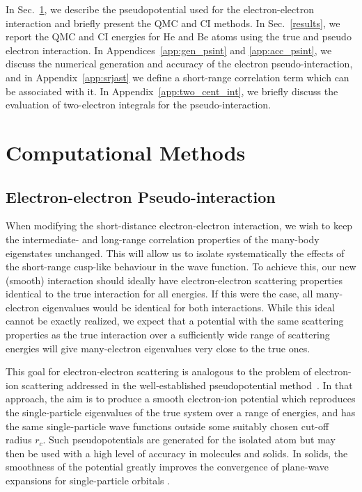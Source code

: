 In Sec.~\ref{methods}, we describe the pseudopotential used for
the electron-electron interaction and briefly present the QMC
and CI methods.
In Sec.~\ref{results}, we report the QMC and CI energies for He 
and Be atoms using the true and pseudo electron interaction.
In Appendices~\ref{app:gen_psint} and \ref{app:acc_psint}, we discuss the
numerical generation and accuracy of the electron pseudo-interaction, 
and in Appendix~\ref{app:srjast} we define a short-range correlation
term which can be associated with it.
In Appendix~\ref{app:two_cent_int}, we briefly discuss the
evaluation of two-electron integrals for the pseudo-interaction.


\section{Computational Methods}
\label{methods}
%
%
\subsection{Electron-electron Pseudo-interaction}
\label{methods:pseudoint}

When modifying the short-distance electron-electron interaction,
we wish to keep the intermediate- and long-range correlation 
properties of the many-body eigenstates unchanged.
This will allow us to isolate systematically the effects of the short-range 
cusp-like behaviour in the wave function.
To achieve this, our new (smooth) interaction should ideally 
have electron-electron scattering properties identical to the true 
interaction for all energies.
If this were the case, all many-electron eigenvalues would be identical 
for both interactions.
While this ideal cannot be exactly realized, we expect that a potential 
with the same scattering properties as the true interaction over 
a sufficiently wide range of scattering energies will give many-electron 
eigenvalues very close to the true ones. 

This goal for electron-electron scattering is analogous to the 
problem of electron-ion scattering addressed in the well-established 
pseudopotential method~\cite{HSC}.
In that approach, the aim is to produce a smooth electron-ion potential 
which reproduces the single-particle eigenvalues of the true system 
over a range of energies, and has the same single-particle wave 
functions outside some suitably chosen cut-off radius $r_c$.
Such pseudopotentials are generated for the isolated atom but may 
then be used with a high level of accuracy in molecules and solids.
In solids, the smoothness of the potential greatly improves the 
convergence of plane-wave expansions for single-particle orbitals
\cite{Pickett}.

